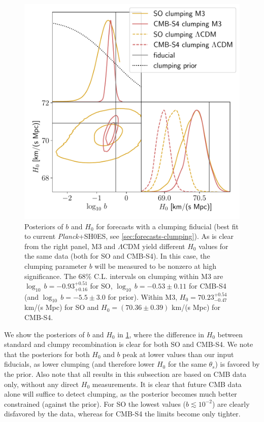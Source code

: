\begin{figure}[ht!]
\includegraphics[width=\columnwidth]{img/forecasts-clumping-b-H0.pdf}
\caption[Posteriors of the clumping parameter and $H_0$ for forecasts with a clumping fiducial]{Posteriors of $b$ and $H_0$ for forecasts with a clumping fiducial (best fit to current {\it Planck}+SH0ES, see \cref{sec:forecasts-clumping}).
As is clear from the right panel, M3 and $\Lambda$CDM yield different $H_0$ values for the same data (both for SO and CMB-S4).
In this case, the clumping parameter $b$ will be measured to be nonzero at high significance.
The 68\% C.L. intervals on clumping within M3 are $\log_{10}\,b = -0.93^{+0.51}_{+0.16}$ for SO, $\log_{10}\,b = -0.53\pm 0.11$ for CMB-S4 (and $\log_{10}\,b = -5.5\pm 3.0$ for prior).
Within M3, $H_0 = 70.23^{+0.54}_{-0.47}$ km/(s Mpc) for SO and $H_0 = (70.36\pm 0.39)$ km/(s Mpc) for CMB-S4.
}
\label{fig:forecasts-clumping-b-H0}
\end{figure}

We show the posteriors of $b$ and $H_0$ in \cref{fig:forecasts-clumping-b-H0}, where the difference in $H_0$ between standard and clumpy recombination is clear for both SO and CMB-S4.
We note that the posteriors for both $H_0$ and $b$ peak at lower values than our input fiducials, as lower clumping (and therefore lower $H_0$ for the same $\theta_s$) is favored by the prior.
Also note that all results in this subsection are based on CMB data only, without any direct $H_0$ measurements.
It is clear that future CMB data alone will suffice to detect clumping, as the posterior becomes much better constrained (against the prior).
For SO the lowest values ($b\lesssim 10^{-2}$) are clearly disfavored by the data, whereas for CMB-S4 the limits become only tighter.

